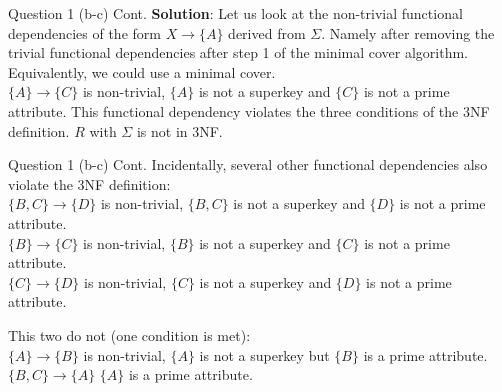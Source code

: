 \begin{frame}[fragile]{Question 1 (b-c) Cont.}
\textbf{Solution}:
Let us look at the non-trivial functional dependencies of the form $X \rightarrow \{A\}$ derived from $\Sigma$. Namely after removing the trivial functional dependencies after step 1 of the minimal cover algorithm. Equivalently, we could use a minimal cover.\\\vspace{3pt}
$\{A\} \rightarrow \{C\}$ is non-trivial, $\{A\}$ is not a superkey and $\{C\}$ is not a prime attribute. This functional dependency violates the three conditions of the 3NF definition. $R$ with $\Sigma$ is not in 3NF.\\\vspace{3pt}

\end{frame}

\begin{frame}[fragile]{Question 1 (b-c) Cont.}
Incidentally, several other functional dependencies also violate the 3NF definition:\\

$\{B, C\} \rightarrow \{D\}$ is non-trivial, $\{B, C\}$ is not a superkey and $\{D\}$ is not a prime attribute.\\
$\{B\} \rightarrow \{C\}$ is non-trivial, $\{B\}$ is not a superkey and $\{C\}$ is not a prime attribute.\\
$\{C\} \rightarrow \{D\}$ is non-trivial, $\{C\}$ is not a superkey and $\{D\}$ is not a prime attribute.\\\vspace{10pt}

This two do not (one condition is met):\\
$\{A\} \rightarrow \{B\}$ is non-trivial, $\{A\}$ is not a superkey but $\{B\}$ is a prime attribute.\\\vspace{3pt}
$\{B, C\} \rightarrow \{A\}$ $\{A\}$ is a prime attribute.\\\vspace{3pt}

\end{frame}

